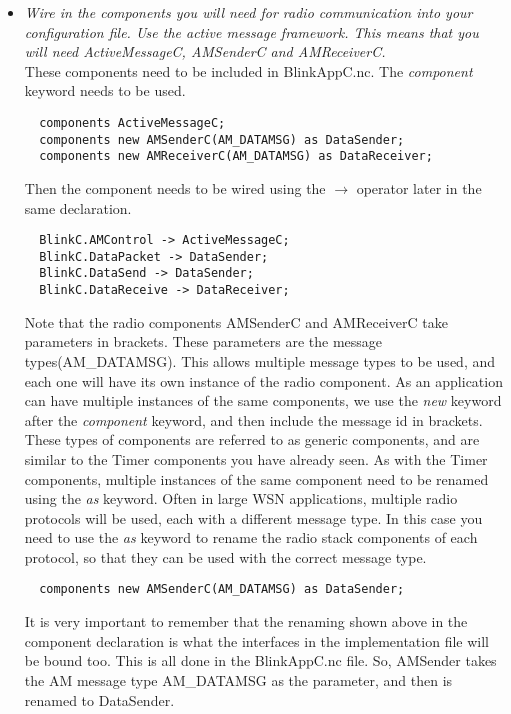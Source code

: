 \documentclass [a4] {article}
\begin{document}
\begin{itemize}

\item \textit{Wire in the components you will need for radio communication into your configuration file. Use the active message framework. This means that you will need ActiveMessageC, AMSenderC and AMReceiverC.}
\linebreak
\\
These components need to be included in BlinkAppC.nc. The \textit{component} keyword needs to be used.

\begin{verbatim}
  components ActiveMessageC;
  components new AMSenderC(AM_DATAMSG) as DataSender;
  components new AMReceiverC(AM_DATAMSG) as DataReceiver;
\end{verbatim}

Then the component needs to be wired using the $\rightarrow$ operator later in the same declaration. 

\begin{verbatim}
  BlinkC.AMControl -> ActiveMessageC;
  BlinkC.DataPacket -> DataSender;
  BlinkC.DataSend -> DataSender;
  BlinkC.DataReceive -> DataReceiver;
\end{verbatim}

Note that the radio components AMSenderC and AMReceiverC take parameters in brackets. These parameters are the message types(AM\_DATAMSG). This allows multiple message types to be used, and each one will have its own instance of the radio component. As an application can have multiple instances of the same components, we use the \textit{new} keyword after the \textit{component} keyword, and then include the message id in brackets. These types of components are referred to as generic components, and are similar to the Timer components you have already seen. As with the Timer components, multiple instances of the same component need to be renamed using the \textit{as} keyword. Often in large WSN applications, multiple radio protocols will be used, each with a different message type. In this case you need to use the \textit{as} keyword to rename the radio stack components of each protocol, so that they can be used with the correct message type.

\begin{verbatim}
  components new AMSenderC(AM_DATAMSG) as DataSender;
\end{verbatim}

It is very important to remember that the renaming shown above in the component declaration is what the interfaces in the implementation file will be bound too. This is all done in the BlinkAppC.nc file. So, AMSender takes the AM message type AM\_DATAMSG as the parameter, and then is renamed to DataSender. 


\end{itemize}
\end{document}
